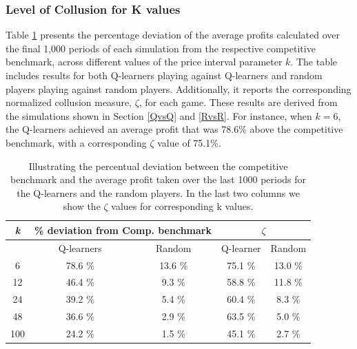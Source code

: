 \documentclass{article}
\begin{document}
\subsubsection{Level of Collusion for K values}
\label{Level of Collusion for K values}
Table \ref{tab:LevelCollusion} presents the percentage deviation of the average profits calculated over the final 1,000 periods of each simulation from the respective competitive benchmark, across different values of the price interval parameter $k$. The table includes results for both Q-learners playing against Q-learners and random players playing against random players. Additionally, it reports the corresponding normalized collusion measure, $\zeta$, for each game. These results are derived from the simulations shown in Section \ref{QvsQ} and \ref{RvsR}. For instance, when $k = 6$, the Q-learners achieved an average profit that was 78.6\% above the competitive benchmark, with a corresponding $\zeta$ value of 75.1\%.
\begin{table}[H]
    \centering
    \begin{tabular}{|c|c|c|c|c|}
        \hline
        \textit{k} & \multicolumn{2}{c|}{\% deviation from Comp. benchmark} & \multicolumn{2}{c|}{$\zeta$}\\
        \hline
        & Q-learners & Random & Q-learner & Random \\
        \hline
        6 & 78.6 \%  & 13.6 \% & 75.1 \% & 13.0 \% \\
        \hline
        12 & 46.4 \% & 9.3 \%  & 58.8 \% & 11.8 \% \\
        \hline 
        24 & 39.2 \% & 5.4 \%  & 60.4 \% & 8.3 \% \\
        \hline
        48 & 36.6 \% & 2.9 \%  & 63.5 \% & 5.0 \% \\
        \hline
        100 & 24.2 \% & 1.5 \%  & 45.1 \% & 2.7 \% \\
        \hline
    \end{tabular}
    \caption{Illustrating the percentual deviation between the competitive benchmark and the average profit taken over the last 1000 periods for the Q-learners and the random players. In the last two columns we show the $\zeta$ values for corresponding k values.}
    \label{tab:LevelCollusion}
\end{table}
\end{document}
